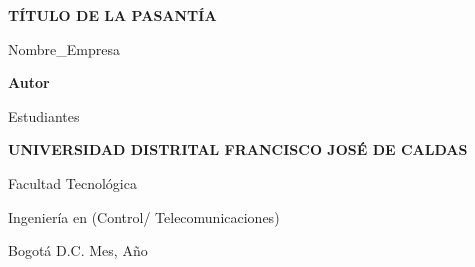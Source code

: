 \documentclass[12pt,letterpaper]{report}
\begin{document}
\setcounter{page}{1}

\begin{titlepage}
\centering
\vspace*{2cm}

{\fontsize{14}{16}\selectfont\bfseries TÍTULO DE LA PASANTÍA\par}
\vspace{0.5cm}
{\fontsize{12}{14}\selectfont Nombre\_Empresa\par}

\vfill

{\fontsize{12}{14}\selectfont\bfseries Autor\par}
\vspace{0.3cm}
{\fontsize{12}{14}\selectfont Estudiantes\par}

\vfill

{\fontsize{12}{14}\selectfont\bfseries UNIVERSIDAD DISTRITAL FRANCISCO JOSÉ DE CALDAS\par}
\vspace{0.3cm}
{\fontsize{12}{14}\selectfont Facultad Tecnológica\par}
\vspace{0.2cm}
{\fontsize{12}{14}\selectfont Ingeniería en (Control/ Telecomunicaciones)\par}

\vfill

{\fontsize{12}{14}\selectfont Bogotá D.C. Mes, Año\par}

\end{titlepage}
\end{document}
